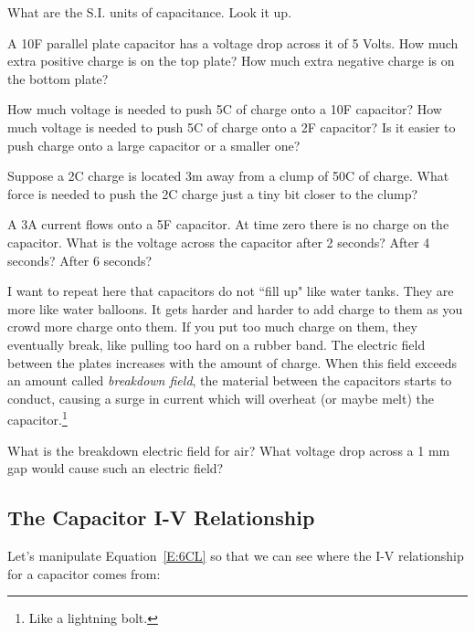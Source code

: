 \begin{alevel}
What are the S.I. units of capacitance. Look it up. 
\end{alevel}

\begin{blevel}
A 10F parallel plate capacitor has a voltage drop across it of 5 Volts. How much extra positive charge is on the top plate? How much extra negative charge is on the bottom plate?
\end{blevel}

\begin{blevel}
How much voltage is needed to push 5C of charge onto a 10F capacitor? How much voltage is needed to push 5C of charge onto a 2F capacitor? Is it easier to push charge onto a large capacitor or a smaller one?
\end{blevel}

\begin{clevel}
Suppose a 2C charge is located 3m away from a clump of 50C of charge. What force is needed to push the 2C charge just a tiny bit closer to the clump?
\end{clevel}

\begin{clevel}
A 3A current flows onto a 5F capacitor. At time zero there is no charge on the capacitor. What is the voltage across the capacitor after 2 seconds? After 4 seconds? After 6 seconds?
\end{clevel}

I want to repeat here that capacitors do not ``fill up" like water tanks. They are more like water balloons. It gets harder and harder to add charge to them as you crowd more charge onto them. If you put too much charge on them, they eventually break, like pulling too hard on a rubber band. The electric field between the plates increases with the amount of charge. When this field exceeds an amount called \emph{breakdown field}, the material between the capacitors starts to conduct, causing a surge in current which will overheat (or maybe melt) the capacitor.\footnote{Like a lightning bolt.}

\begin{blevel}
What is the breakdown electric field for air? What voltage drop across a 1 mm gap would cause such an electric field?
\end{blevel}

\subsection{The Capacitor I-V Relationship}
Let's manipulate Equation~\ref{E:6CL} so that we can see where the I-V relationship for a capacitor comes from:

